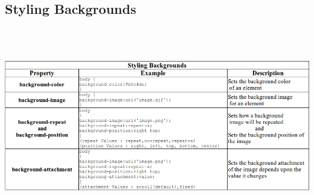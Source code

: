 \documentclass[11pt,a4paper]{article}
\begin{document}
\subsection*{Styling Backgrounds}
\begin{center}
\includegraphics[width=155mm,height=85mm]{Backgrounds.png}\\
\end{center}
\end{document}
